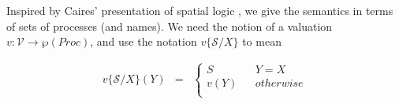 \documentclass[]{amsart}
\makeatletter
\newcommand{\id}[1]{\texttt{#1}}
\newcommand{\pzero}{\mathbin{0}}
\newcommand{\juxtap}{\mathbin{\id{|}}}
\newcommand{\concat}{\Rightarrow}
\newcommand{\scong}{\mathbin{\equiv}}
\newcommand{\nameeq}{\mathbin{\equiv_N}}
\newcommand{\binpar}[2]{#1 \juxtap #2}
\newcommand{\prefix}[3]{#1 ? ( #2 ) \concat #3}
\newcommand{\lift}[2]{#1 ! ( #2 )}
\newcommand{\quotep}[1]{@#1}
\newcommand{\dropn}[1]{*#1}
\newcommand{\substn}[2]{\id{\{} #1 / #2 \id{\}}}
\newcommand{\Proc}{\mathbin{Proc}}
\newcommand{\ptrue}{\mathbin{true}}
\newcommand{\pdropf}[1]{* #1}
\newcommand{\plift}[2]{#1 ! ( #2 )}
\newcommand{\pprefix}[3]{\langle #1 ? #2 \rangle #3}
\newcommand{\riff}{\Leftrightarrow}
\newcommand{\PropVar}{\mathbin{\mathcal{V}}}
\theoremstyle{definition}
\theoremstyle{remark}
\numberwithin{equation}{subsection}
\makeatother
\begin{document}


Inspired by Caires' presentation of spatial logic
\cite{DBLP:conf/fossacs/Caires04}, we give the semantics in terms of
sets of processes (and names). We need the notion of a valuation $v :
\PropVar \to \wp(\Proc)$, and use the notation $v\substn{\mathcal{S}}{X}$ to mean 

\begin{eqnarray}
  v\substn{\mathcal{S}}{X}(Y) & = &
  \left\{ \begin{array}{ccc}
      S & & Y = X \\
      v(Y) & & otherwise \\
    \end{array}
  \right.\nonumber
\end{eqnarray}
\end{document}
